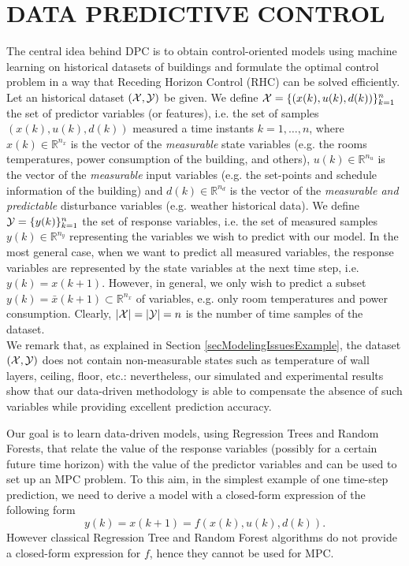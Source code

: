 \section{DATA PREDICTIVE CONTROL}
\label{S:dpc}

\textcolor[rgb]{0,0,1}{The central idea behind DPC is to obtain control-oriented models using machine learning on historical datasets of buildings and formulate the optimal control problem in a way that Receding Horizon Control (RHC) can be solved efficiently. Let an historical dataset $(\mathcal{X},\mathcal{Y})$ be given.
We define $\mathcal{X} = \{(x(k),u(k),d(k))\}_{k=1}^n$ the set of predictor variables (or features), i.e. the set of samples $(x(k),u(k),d(k))$ measured a time instants $k=1,\ldots,n$, where $x(k)\in\mathbb{R}^{n_x}$ is the vector of the \emph{measurable} state variables (e.g. the rooms temperatures, power consumption of the building, and others), $u(k)\in\mathbb{R}^{n_u}$ is the vector of the \emph{measurable} input variables (e.g. the set-points and schedule information of the building) and $d(k)\in\mathbb{R}^{n_d}$ is the vector of the \emph{measurable and predictable} disturbance variables (e.g. weather historical data).
We define $\mathcal{Y} = \{y(k)\}_{k=1}^{n}$ the set of response variables, i.e. the set of measured samples $y(k)\in\mathbb{R}^{n_y}$ representing the variables we wish to predict with our model. In the most general case, when we want to predict all measured variables, the response variables are represented by the state variables at the next time step, i.e. $y(k) = x(k+1)$. However, in general, we only wish to predict a subset $y(k) = \bar x(k+1) \subset \mathbb{R}^{n_x}$ of variables, e.g. only room temperatures and power consumption.
Clearly, $|\mathcal{X}| = |\mathcal{Y}| = n$ is the number of time samples of the dataset.\\
We remark that, as explained in Section \ref{secModelingIssuesExample}, the dataset $(\mathcal{X},\mathcal{Y})$ does not contain non-measurable states such as temperature of wall layers, ceiling, floor, etc.: nevertheless, our simulated and experimental results show that our data-driven methodology is able to compensate the absence of such variables while providing excellent prediction accuracy.}

\textcolor[rgb]{0,0,1}{Our goal is to learn data-driven models, using Regression Trees and Random Forests, that relate the value of the response variables (possibly for a certain future time horizon) with the value of the predictor variables and can be used to set up an MPC problem. To this aim, in the simplest example of one time-step prediction, we need to derive a model with a closed-form expression of the following form
\begin{equation}\label{E:GenericModel}
	y(k)=x(k+1)=f(x(k),u(k),d(k)).
\end{equation}
However classical Regression Tree and Random Forest algorithms do not provide a closed-form expression for $f$, hence they cannot be used for MPC.}

